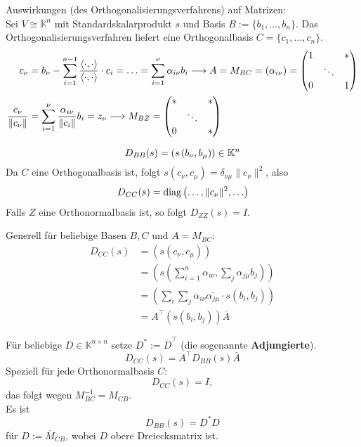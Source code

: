 \documentclass[parskip,a4paper,twoside,DIV15,BCOR12mm]{scrbook}
\begin{document}
Auswirkungen (des Orthogonalisierungsverfahrens) auf Matrizen:\\
Sei \(V\cong\mathbb{K}^{n}\) mit Standardskalarprodukt \(s\) und Basis
\(B:=\{b_{1},\ldots,b_{n}\}\).
Das Orthogonalisierungsverfahren liefert eine Orthogonalbasis 
\(C=\{c_{1},\ldots,c_{n}\}\).
\begin{align*}
c_{\nu}&=b_{\nu}-\sum_{i=1}^{n-1}{\frac{\operatorname{\langle\cdot,\cdot\rangle}}{\operatorname{\langle\cdot,\cdot\rangle}}\cdot c_{i}}=\ldots
    =\sum_{i=1}^{\nu}{\alpha_{i\nu}b_{i}}
    \longrightarrow A=M_{BC}=\left(\alpha_{i\nu}\right)=
    \begin{pmatrix}1&&*\\&\ddots&\\0&&1\end{pmatrix}\\
\frac{c_{\nu}}{\lVert c_{\nu}\rVert}
    &=\sum_{i=1}^{\nu}{\frac{\alpha_{i\nu}}{\lVert c_{i}\rVert}b_{i}}=z_{\nu}
    \longrightarrow M_{BZ}=
	\begin{pmatrix}*&&*\\&\ddots&\\0&&*\end{pmatrix}
\end{align*}
\begin{remind}[Darstellungsmatrix]
\[
D_{BB}(s)=\left(s\left(b_{\nu},b_{\mu}\right)\right)\in\mathbb{K}^{n}\\
\]
Da \(C\) eine Orthogonalbasis ist, folgt
\(s\left(c_{\nu},c_{\mu}\right)=\delta_{\nu\mu}\lVert c_{\nu}\rVert^{2}\), also
\[
D_{CC}(s)=\operatorname{diag}\left(\ldots,\lVert c_{\nu}\rVert^{2},\ldots\right)
\]
Falls \(Z\) eine Orthonormalbasis ist, so folgt \(D_{ZZ}(s)=I\).

Generell für beliebige Basen \(B,C\) und \(A=M_{BC}\):
\begin{align*}
D_{CC}(s)&=\left(s\left(c_{\nu},c_{\mu}\right)\right)\\
&=\left(s\left(\sum_{i=1}^{n}{\alpha_{i\nu}},\sum_{j}{\alpha_{j\mu}b_{j}}\right)\right)\\
&=\left(\sum_{i}{\sum_{j}{\alpha_{i\nu}\overline{\alpha_{j\mu}}\cdot s(b_{i},b_{j})}}\right)\\
&=A^{\top}\left(s(b_{i},b_{j})\right)\overline{A}
\end{align*}
\end{remind}
\begin{definition}
Für beliebige \(D\in\mathbb{K}^{n\times n}\) setze \(D^{*}:=\overline{D}^{\top}\) (die sogenannte \textbf{Adjungierte}).
\[
D_{CC}(s)=A^{\top}D_{BB}(s)\overline{A}
\]
Speziell für jede Orthonormalbasis \(C\):
\[
D_{CC}(s)=I,
\]
das folgt wegen \(M_{BC}^{-1}=M_{CB}\).\\
Es ist 
\[
D_{BB}(s)=D^{*}D
\]
für \(D:=\overline{M}_{CB}\), wobei \(D\) obere Dreiecksmatrix ist.
\end{definition}
\end{document}
